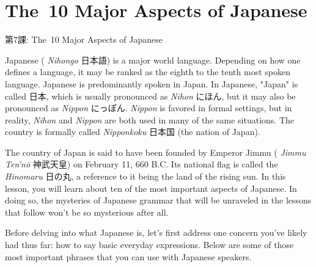     
\chapter{The 10 Major Aspects of Japanese}

\begin{center}
\begin{Large}
第7課: The 10 Major Aspects of Japanese 
\end{Large}
\end{center}
 
\par{ Japanese ( \emph{Nihongo }日本語) is a major world language. Depending on how one defines a language, it may be ranked as the eighth to the tenth most spoken language. Japanese is predominantly spoken in Japan. In Japanese, "Japan" is called 日本, which is usually pronounced as \emph{Nihon }にほん, but it may also be pronounced as \emph{Nippon }にっぽん. \emph{Nippon }is favored in formal settings, but in reality, \emph{Nihon }and \emph{Nippon }are both used in many of the same situations. The country is formally called \emph{Nipponkoku }日本国 (the nation of Japan). }

\par{ The country of Japan is said to have been founded by Emperor Jimmu ( \emph{Jimmu Ten'nō }神武天皇) on February 11, 660 B.C. Its national flag is called the \emph{Hinomaru }日の丸, a reference to it being the land of the rising sun. In this lesson, you will learn about ten of the most important aspects of Japanese. In doing so, the mysteries of Japanese grammar that will be unraveled in the lessons that follow won't be so mysterious after all. }

\par{ Before delving into what Japanese is, let's first address one concern you've likely had thus far: how to say basic everyday expressions. Below are some of those most important phrases that you can use with Japanese speakers. }

